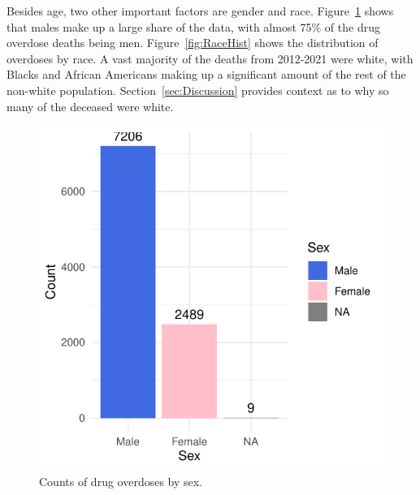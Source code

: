 \documentclass[12pt, letterpaper, titlepage]{article}
\begin{document}
Besides age, two other important factors are gender and race.  Figure~\ref{fig:SexHist} shows that males make up a large share of the data, with almost 75\% of the drug overdose deaths being men.  Figure~\ref{fig:RaceHist} shows the distribution of overdoses by race.  A vast majority of the deaths from 2012-2021 were white, with Blacks and African Americans making up a significant amount of the rest of the non-white population. Section~\ref{sec:Discussion} provides context as to why so many of the deceased were white.

\begin{figure}[tbp]
    \centering
    \includegraphics{SexHist}
    \caption{Counts of drug overdoses by sex.}
    \label{fig:SexHist}
  \end{figure}
\end{document}
